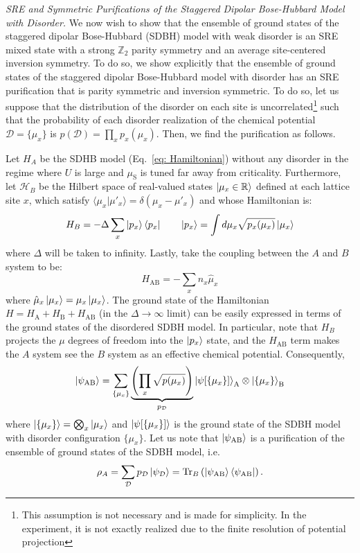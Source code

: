 \documentclass[preprint,superscriptaddress,floatfix, nofootinbib]{revtex4-2}
\begin{document}
\textit{SRE and Symmetric Purifications of the Staggered Dipolar Bose-Hubbard Model with Disorder.} We now wish to show that the ensemble of ground states of the staggered dipolar Bose-Hubbard (SDBH) model with weak disorder is an SRE mixed state with a strong $\mathbb{Z}_2$ parity symmetry and an average site-centered inversion symmetry.
To do so, we show explicitly that the ensemble of ground states of the staggered dipolar Bose-Hubbard model with disorder has an SRE purification that is parity symmetric and inversion symmetric.
%
To do so, let us suppose that the distribution of the disorder on each site is uncorrelated\footnote{This assumption is not necessary and is made for simplicity. In the experiment, it is not exactly realized due to the finite resolution of potential projection} such that the probability of each disorder realization of the chemical potential $\mathcal{D} = \{\mu_x\}$ is $p(\mathcal{D}) = \prod_{x} p_x(\mu_x)$.
%
Then, we find the purification as follows.

%
Let $H_A$ be the SDHB model (Eq.~\eqref{eq: Hamiltonian}) without any disorder in the regime where $U$ is large and $\mu_{\text{S}}$ is tuned far away from criticality.
%
Furthermore, let $\mathcal{H}_B$ be the Hilbert space of real-valued states $\ket{\mu_x \in \mathbb{R}}$ defined at each lattice site $x$, which satisfy $\langle \mu_x|\mu'_x\rangle =  \delta(\mu_x - \mu'_x)$ and
whose Hamiltonian is: 
\begin{equation}
    H_{B} = -\Delta \sum_{x} \ket{p_x} \bra{p_x} \qquad \ket{p_x} = \int d\mu_x \sqrt{p_x(\mu_x)} \ket{\mu_x}  
\end{equation}
where $\Delta$ will be taken to infinity.
%
Lastly, take the coupling between the $A$ and $B$ system to be: 
\begin{equation}
    H_{\text{AB}} = - \sum_{x} n_x \hat{\mu}_x
\end{equation}
where $\hat{\mu}_x \ket{\mu_x} = \mu_x \ket{\mu_x}$. 
%
The ground state of the Hamiltonian $H = H_{\text{A}} + H_{\text{B}} + H_{\text{AB}}$ (in the $\Delta \to \infty$ limit) can be easily expressed in terms of the ground states of the disordered SDBH model. 
%
In particular, note that $H_B$ projects the $\mu$ degrees of freedom into the $\ket{p_x}$ state, and the $H_{\text{AB}}$ term makes the $A$ system see the $B$ system as an effective chemical potential.
%
Consequently,
\begin{equation}
    \ket{\psi_{\text{AB}}} = \sum_{\{\mu_x\}} \underbrace{\left(\prod_{x} \sqrt{p(\mu_x)} \right)}_{p_{\mathcal{D}}} \ket{\psi[\{\mu_x\}]}_{\text{A}} \otimes \ket{\{\mu_x\}}_{\text{B}}
\end{equation}
where $\ket{\{\mu_x\}} = \bigotimes_x\ket{\mu_x}$ and $\ket{\psi[\{\mu_x\}]}$ is the ground state of the SDBH model with disorder configuration $\{\mu_x\}$.
%
Let us note that $\ket{\psi_{\text{AB}}}$ is a purification of the ensemble of ground states of the SDBH model, i.e. 
\begin{equation}
    \rho_A = \sum_{\mathcal{D}} p_{\mathcal{D}} \ket{\psi_{\mathcal{D}}} = \text{Tr}_B\left(\ket{\psi_{\text{AB}}}\bra{\psi_{\text{AB}}}\right).
\end{equation}
\end{document}
